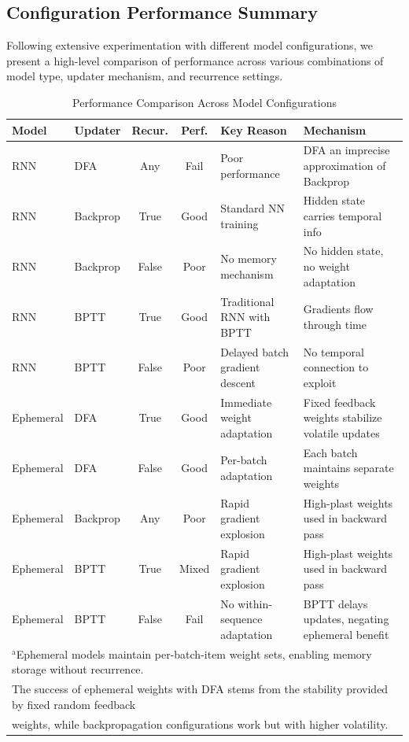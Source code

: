 \documentclass[conference]{IEEEtran}
\begin{document}
\subsection{Configuration Performance Summary}

Following extensive experimentation with different model configurations, we present a high-level comparison of performance across various combinations of model type, updater mechanism, and recurrence settings. 

\begin{table}[htbp]
\caption{Performance Comparison Across Model Configurations}
\begin{center}
\begin{tabular}{|l|l|c|c|l|l|}
\hline
\textbf{Model} & \textbf{Updater} & \textbf{Recur.} & \textbf{Perf.} & \textbf{Key Reason} & \textbf{Mechanism} \\
\hline
RNN & DFA & Any & Fail & Poor performance & DFA an imprecise approximation of Backprop \\
RNN & Backprop & True & Good & Standard NN training & Hidden state carries temporal info \\
RNN & Backprop & False & Poor & No memory mechanism & No hidden state, no weight adaptation \\
RNN & BPTT & True & Good & Traditional RNN with BPTT & Gradients flow through time \\
RNN & BPTT & False & Poor & Delayed batch gradient descent & No temporal connection to exploit \\
\hline
Ephemeral & DFA & True & Good & Immediate weight adaptation & Fixed feedback weights stabilize volatile updates \\
Ephemeral & DFA & False & Good & Per-batch adaptation & Each batch maintains separate weights \\
Ephemeral & Backprop & Any & Poor & Rapid gradient explosion & High-plast weights used in backward pass \\
Ephemeral & BPTT & True & Mixed & Rapid gradient explosion & High-plast weights used in backward pass \\
Ephemeral & BPTT & False & Fail & No within-sequence adaptation & BPTT delays updates, negating ephemeral benefit \\
\hline
\multicolumn{6}{l}{$^{\mathrm{a}}$Ephemeral models maintain per-batch-item weight sets, enabling memory storage without recurrence.} \\
\multicolumn{6}{l}{The success of ephemeral weights with DFA stems from the stability provided by fixed random feedback} \\
\multicolumn{6}{l}{weights, while backpropagation configurations work but with higher volatility.}
\end{tabular}
\label{tab:configuration_comparison}
\end{center}
\end{table}
\end{document}
